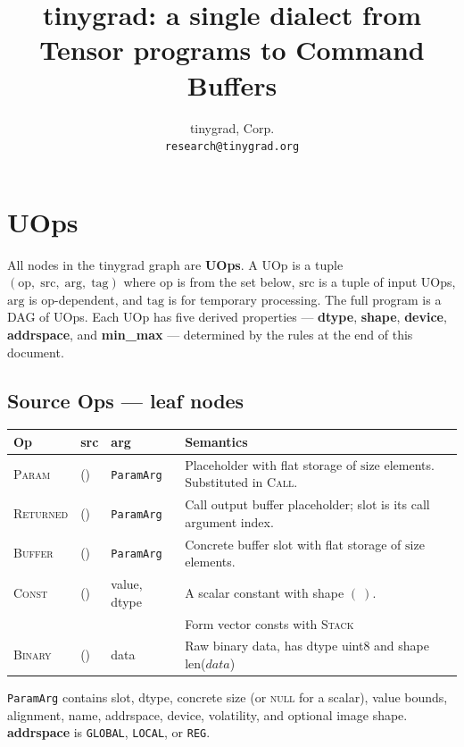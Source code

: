 \documentclass[10pt,letterpaper]{article}
\title{tinygrad: a single dialect from Tensor programs to Command Buffers}
\author{tinygrad, Corp. \\ \texttt{research@tinygrad.org}}
\date{}
\newcommand{\op}[1]{\textsc{#1}}
\begin{document}
\maketitle
\thispagestyle{empty}

\section*{UOps}

All nodes in the tinygrad graph are \textbf{UOps}. A UOp is a tuple $(\mathrm{op},\;\mathrm{src},\;\mathrm{arg},\;\mathrm{tag})$ where $\mathrm{op}$ is from the set below, $\mathrm{src}$ is a tuple of input UOps, $\mathrm{arg}$ is op-dependent, and $\mathrm{tag}$ is for temporary processing. The full program is a DAG of UOps. Each UOp has five derived properties --- \textbf{dtype}, \textbf{shape}, \textbf{device}, \textbf{addrspace}, and \textbf{min\_max} --- determined by the rules at the end of this document.

\subsection*{Source Ops \normalfont\small--- leaf nodes}

\begin{tabular}{@{}l p{3.2cm} p{3.0cm} p{6.2cm}@{}}
\toprule
\textbf{Op} & \textbf{src} & \textbf{arg} & \textbf{Semantics} \\
\midrule
\op{Param} & () & \texttt{ParamArg} &
  Placeholder with flat storage of $\mathrm{size}$ elements. Substituted in \op{Call}. \\[4pt]
\op{Returned} & () & \texttt{ParamArg} &
  Call output buffer placeholder; slot is its call argument index. \\[4pt]
\op{Buffer} & () & \texttt{ParamArg} &
  Concrete buffer slot with flat storage of $\mathrm{size}$ elements. \\
\op{Const} & () & value, dtype &
  A scalar constant with shape $(\ )$. \\
  & & & Form vector consts with \op{Stack} \\
\op{Binary} & () & data & Raw binary data, has dtype uint8 and shape len($data$)  \\
\bottomrule
\end{tabular}

\smallskip
\texttt{ParamArg} contains slot, dtype, concrete size (or \textsc{null} for a scalar), value bounds, alignment, name, addrspace, device, volatility, and optional image shape. \textbf{addrspace} is \texttt{GLOBAL}, \texttt{LOCAL}, or \texttt{REG}.
\end{document}
